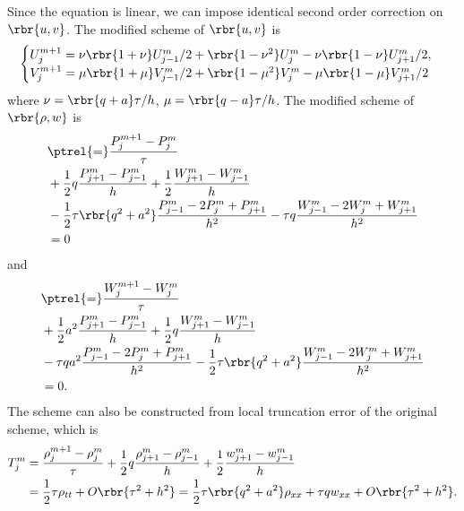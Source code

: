 \documentclass[english, nochinese]{pnote}
\begin{document}
Since the equation is linear, we can impose identical second order correction on $ \rbr{ u, v } $. The modified scheme of $ \rbr{ u, v } $ is
\begin{equation}
\begin{cases}
U_j^{ m + 1 } = \nu \rbr{ 1 + \nu } U_{ j - 1 }^m / 2 + \rbr{ 1 - \nu^2 } U_j^m - \nu \rbr{ 1 - \nu } U_{ j + 1 }^m / 2, \\
V_j^{ m + 1 } = \mu \rbr{ 1 + \mu } V_{ j - 1 }^m / 2 + \rbr{ 1 - \mu^2 } V_j^m - \mu \rbr{ 1 - \mu } V_{ j + 1 }^m / 2
\end{cases}
\end{equation}
where $ \nu = \rbr{ q + a } \tau / h $, $ \mu = \rbr{ q - a } \tau / h $. The modified scheme of $ \rbr{ \rho, w } $ is
\begin{equation}
\begin{split}
&\ptrel{=} \frac{ P_j^{ m + 1 } - P_j^m }{\tau} \\
&+ \frac{1}{2} q \frac{ P_{ j + 1 }^m - P_{ j - 1 }^m }{h} + \frac{1}{2} \frac{ W_{ j + 1 }^m - W_{ j - 1 }^m }{h} \\
&- \frac{1}{2} \tau \rbr{ q^2 + a^2 } \frac{ P_{ j - 1 }^m - 2 P_j^m + P_{ j + 1 }^m }{h^2} - \tau q \frac{ W_{ j - 1 }^m - 2 W_j^m + W_{ j + 1 }^m }{h^2} \\
&= 0
\end{split}
\end{equation}
and
\begin{equation}
\begin{split}
&\ptrel{=} \frac{ W_j^{ m + 1 } - W_j^m }{\tau} \\
&+ \frac{1}{2} a^2 \frac{ P_{ j + 1 }^m - P_{ j - 1 }^m }{h} + \frac{1}{2} q \frac{ W_{ j + 1 }^m - W_{ j - 1 }^m }{h} \\
&- \tau q a^2 \frac{ P_{ j - 1 }^m - 2 P_j^m + P_{ j + 1 }^m }{h^2} - \frac{1}{2} \tau \rbr{ q^2 + a^2 } \frac{ W_{ j - 1 }^m - 2 W_j^m + W_{ j + 1 }^m }{h^2} \\
&= 0.
\end{split}
\end{equation}
The scheme can also be constructed from local truncation error of the original scheme, which is
\begin{equation}
\begin{split}
T_j^m &= \frac{ \rho_j^{ m + 1 } - \rho_j^m }{\tau} + \frac{1}{2} q \frac{ \rho_{ j + 1 }^m - \rho_{ j - 1 }^m }{h} + \frac{1}{2} \frac{ w_{ j + 1 }^m - w_{ j - 1 }^m }{h} \\
&= \frac{1}{2} \tau \rho_{ t t } + O \rbr{ \tau^2 + h^2 }  = \frac{1}{2} \tau \rbr{ q^2 + a^2 } \rho_{ x x } + \tau q w_{ x x } + O \rbr{ \tau^2 + h^2 }.
\end{split}
\end{equation}
\end{document}

